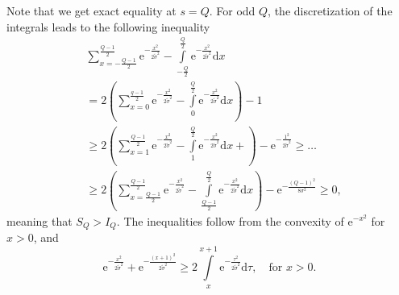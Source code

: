 \documentclass[journal, twoside, web]{ieeecolorpreprint}
\begin{document}
Note that we get exact equality at $s=Q$. For odd $Q$, the discretization of the integrals leads to the following inequality
    \begin{align*}
        & \sum \limits_{x = -\frac{Q-1}{2}}^{\frac{Q-1}{2}} \mathrm{e}^{-\frac{x^2}{2 \tilde \sigma^2}}- \int \limits_{-\frac{Q}{2}}^{\frac{Q}{2}} \mathrm{e}^{-\frac{x^2}{2\tilde \sigma^2}} \mathrm{d}x \\
        & = 2\left (\sum \limits_{x = 0}^{\frac{q-1}{2}} \mathrm{e}^{-\frac{x^2}{2 \tilde \sigma^2}}- \int \limits_{0}^{\frac{Q}{2}} \mathrm{e}^{-\frac{x^2}{2\tilde \sigma^2}} \mathrm{d}x \right) - 1 \\ 
        & \geq  2\left (\sum \limits_{x = 1}^{\frac{Q-1}{2}} \mathrm{e}^{-\frac{x^2}{2 \tilde \sigma^2}}- \int \limits_{1}^{\frac{Q}{2}} \mathrm{e}^{-\frac{x^2}{2\tilde \sigma^2}} \mathrm{d}x + \right) - \mathrm{e}^{-\frac{1^2 }{2\tilde \sigma^2}} \geq \dots \\
        & \geq 2\left (\sum \limits_{x = \frac{Q-1}{2}}^{\frac{Q-1}{2}} \mathrm{e}^{-\frac{x^2}{2 \tilde \sigma^2}} - \int \limits_{\frac{Q-1}{2}}^{\frac{Q}{2}} \mathrm{e}^{-\frac{x^2}{2\tilde \sigma^2}} \mathrm{d}x\right) - \mathrm{e}^{- \frac{\left(Q-1\right)^2}{8 \sigma^2}} \geq 0,%
    \end{align*}
    meaning that $S_Q>I_Q$. The inequalities follow from the convexity of $\mathrm{e}^{-x^2}$ for $x > 0$, and
    \begin{equation} \label{eq:helper_ineq_sum_int}
        \mathrm{e}^{-\frac{x^2}{2\tilde \sigma^2}} + \mathrm{e}^{-\frac{(x+1)^2}{2\tilde \sigma^2}} \geq 2 \int \limits_x^{x+1} \mathrm{e}^{-\frac{\tau^2}{2\tilde \sigma^2}}\mathrm{d}\tau, \quad \text{for } x>0.
    \end{equation}
\end{document}
